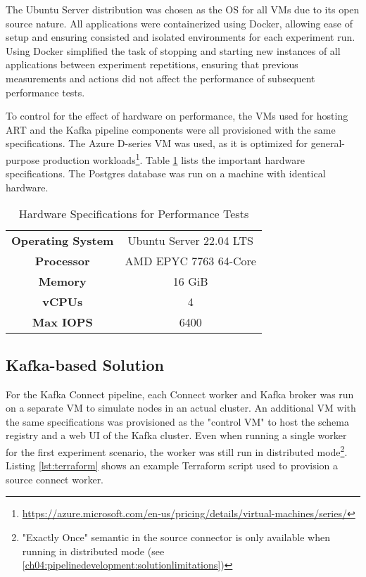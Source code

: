 The Ubuntu Server distribution was chosen as the \ac{OS} for all \ac{VM}s due to its open source nature. All applications were containerized using Docker, allowing ease of setup and ensuring consisted and isolated environments for each experiment run. Using Docker simplified the task of stopping and starting new instances of all applications between experiment repetitions, ensuring that previous measurements and actions did not affect the performance of subsequent performance tests.

To control for the effect of hardware on performance, the \ac{VM}s used for hosting \ac{ART} and the Kafka pipeline components were all provisioned with the same specifications. The Azure D-series \ac{VM} was used, as it is optimized for general-purpose production workloads\footnote{\url{https://azure.microsoft.com/en-us/pricing/details/virtual-machines/series/}}. Table \ref{tab:hardwarespecs} lists the important hardware specifications. The Postgres database was run on a machine with identical hardware.


\begin{table}
    \centering
    \begin{tabular}{|cc|}
        \hline
         \textbf{Operating System} & Ubuntu Server 22.04 LTS \\
         \textbf{Processor} & AMD EPYC 7763 64-Core \\
         \textbf{Memory} & 16 GiB \\
         \textbf{vCPUs} & 4 \\
         \textbf{Max IOPS} & 6400 \\
        \hline
    \end{tabular}
    \caption{Hardware Specifications for Performance Tests}
    \label{tab:hardwarespecs}
\end{table}





\subsection{Kafka-based Solution}
For the Kafka Connect pipeline, each Connect worker and Kafka broker was run on a separate \ac{VM} to simulate nodes in an actual cluster. An additional \ac{VM} with the same specifications was provisioned as the "control \ac{VM}" to host the schema registry and a web UI of the Kafka cluster. Even when running a single worker for the first experiment scenario, the worker was still run in distributed mode\footnote{"Exactly Once" semantic in the source connector is only available when running in distributed mode (see \ref{ch04:pipelinedevelopment:solutionlimitations})}. Listing \ref{lst:terraform} shows an example Terraform script used to provision a source connect worker.

